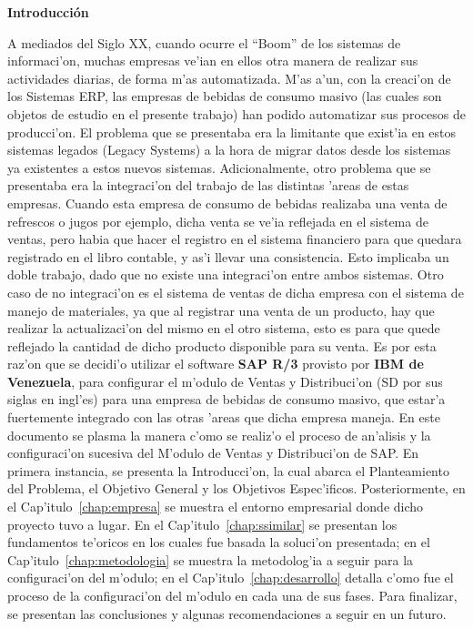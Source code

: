 
\begin{center}
	{\bf Introducci\'on} \label{chap:intro}
\end{center}

\label{sect:motivacion}

	A mediados del Siglo XX, cuando ocurre el ``Boom'' de los sistemas de informaci'on, muchas empresas ve'ian en ellos otra manera de realizar sus actividades diarias, de forma m'as automatizada. M'as a'un, con la creaci'on de los Sistemas ERP, las empresas de bebidas de consumo masivo (las cuales son objetos de estudio en el presente trabajo) han podido automatizar sus procesos de producci'on. El problema que se presentaba era la limitante que exist'ia en estos sistemas legados (Legacy Systems) a la hora de migrar datos desde los sistemas ya existentes a estos nuevos sistemas.
\newline
\newline
\indent Adicionalmente, otro problema que se presentaba era la integraci'on del trabajo de las distintas 'areas de estas empresas. Cuando esta empresa de consumo de bebidas realizaba una venta de refrescos o jugos por ejemplo, dicha venta se ve'ia reflejada en el sistema de ventas, pero habia que hacer el registro en el sistema financiero para que quedara registrado en el libro contable, y as'i llevar una consistencia. Esto implicaba un doble trabajo, dado que no existe una integraci'on entre ambos sistemas. Otro caso de no integraci'on es el sistema de ventas de dicha empresa con el sistema de manejo de materiales, ya que al registrar una venta de un producto, hay que realizar la actualizaci'on del mismo en el otro sistema, esto es para que quede reflejado la cantidad de dicho producto disponible para su venta.
\newline
\newline
\indent Es por esta raz'on que se decidi'o utilizar el software \textbf{SAP R/3} provisto por \textbf{IBM de Venezuela}, para configurar el m'odulo de Ventas y Distribuci'on (SD por sus siglas en ingl'es) para una empresa de bebidas de consumo masivo, que estar'a fuertemente integrado con las otras 'areas que dicha empresa maneja.
\newline
\newline
\indent En este documento se plasma la manera c'omo se realiz'o el proceso de an'alisis y la configuraci'on sucesiva del M'odulo de Ventas y Distribuci'on de SAP. En primera instancia, se presenta la Introducci'on, la cual abarca el Planteamiento del Problema, el Objetivo General y los Objetivos Espec'ificos. Posteriormente, en el Cap'itulo~\ref{chap:empresa} se muestra el entorno empresarial donde dicho proyecto tuvo a lugar. En el Cap'itulo~\ref{chap:ssimilar} se presentan los fundamentos te'oricos en los cuales fue basada la soluci'on presentada; en el Cap'itulo~\ref{chap:metodologia} se muestra la metodolog'ia a seguir para la configuraci'on del m'odulo; en el Cap'itulo~\ref{chap:desarrollo} detalla c'omo fue el proceso de la configuraci'on del m'odulo en cada una de sus fases. Para finalizar, se presentan las conclusiones y algunas recomendaciones a seguir en un futuro.
